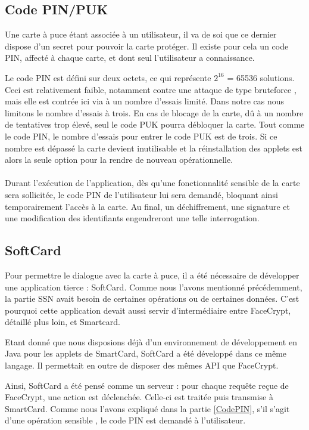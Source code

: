 \documentclass[a4paper,11pt,french]{article}
\begin{document}
\label{CodePIN}
\subsection{Code PIN/PUK}
Une carte à puce étant associée à un utilisateur, il va de soi que ce dernier 
dispose d'un secret pour pouvoir la carte protéger. Il existe pour cela un code 
PIN, affecté à chaque carte, et dont seul l'utilisateur a connaissance.

Le code PIN est défini sur deux octets, ce qui représente $2^{16}$ = 65536 solutions.
Ceci est relativement faible, notamment contre une attaque de type 
\og{}bruteforce \fg{}, mais elle est contrée ici via à un nombre d'essais limité.
Dans notre cas nous limitons le nombre d'essais à trois. En cas de blocage de la
carte, dû à un nombre de tentatives trop élevé, seul le code PUK pourra 
débloquer la carte. Tout comme le code PIN, le nombre d'essais pour entrer le 
code PUK est de trois. Si ce nombre est dépassé la carte devient inutilisable et
la réinstallation des applets est alors la seule option pour la rendre
de nouveau opérationnelle.

\paragraph{}
Durant l'exécution de l'application, dès qu'une fonctionnalité sensible de la 
carte sera sollicitée, le code PIN de l'utilisateur lui sera demandé, bloquant 
ainsi temporairement l'accès à la carte. Au final, un déchiffrement, une signature
et une modification des identifiants engendreront une telle interrogation.

\subsection{SoftCard}
Pour permettre le dialogue avec la carte à puce, il a été nécessaire de développer
une application tierce : SoftCard. Comme nous l'avons mentionné précédemment,
la partie SSN avait besoin de certaines opérations ou de certaines données. 
C'est pourquoi cette application devait aussi servir d'intermédiaire entre 
FaceCrypt, détaillé plus loin, et Smartcard.

Etant donné que nous disposions déjà d'un environnement de développement en Java
pour les applets de SmartCard, SoftCard a été développé dans ce même langage. Il
permettait en outre de disposer des mêmes API que FaceCrypt.

Ainsi, SoftCard a été pensé comme un serveur : pour chaque requête reçue de 
FaceCrypt, une action est déclenchée. Celle-ci est traitée puis transmise à
SmartCard. Comme nous l'avons expliqué dans la partie \ref{CodePIN}, s'il s'agit
d'une opération \og sensible \fg, le code PIN est demandé à l'utilisateur.
\end{document}
